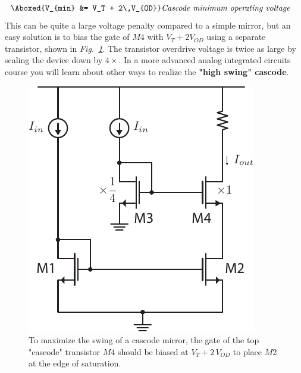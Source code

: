     \begin{align}
        \Aboxed{V_{min} &= V_T + 2\,V_{OD}} &\textit{Cascode minimum operating voltage}
        \label{eq:cascode_min_voltage}
    \end{align}
This can be quite a large voltage penalty compared to a simple mirror, but an easy solution is to bias the gate of $M4$ with $V_T + 2 V_{OD}$ using a separate transistor, shown in \emph{Fig.~\ref{fig:cascode_hiswing}}.  The transistor overdrive voltage is twice as large by scaling the device down by $4\times$.  In a more advanced analog integrated circuits course you will learn about other ways to realize the \textbf{"high swing" cascode}.
\begin{figure}[H]
\centering
\includegraphics[scale=1]{mirror_cascode_hiswing.pdf}
\caption{To maximize the swing of a cascode mirror, the gate of the top "cascode" transistor $M4$ should be biased at $V_T + 2\,V_{OD}$ to place $M2$ at the edge of saturation.}
\label{fig:cascode_hiswing}
\end{figure}
\newpage
